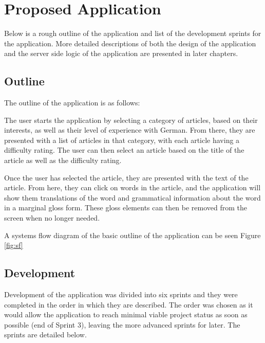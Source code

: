 \chapter{Proposed Application}

Below is a rough outline of the application and list of the development sprints for the application. More detailed descriptions of both the design of the application and the server side logic of the application are presented in later chapters. 

\section{Outline}

The outline of the application is as follows: 

The user starts the application by selecting a category of articles, based on their interests, as well as their level of experience with German. From there, they are presented with a list of articles in that category, with each article having a difficulty rating. The user can then select an article based on the title of the article as well as the difficulty rating.

Once the user has selected the article, they are presented with the text of the article. From here, they can click on words in the article, and the application will show them translations of the word and grammatical information about the word in a marginal gloss form. These gloss elements can then be removed from the screen when no longer needed.

A systems flow diagram of the basic outline of the application can be seen Figure \ref{fig:sf}



\section{Development}

Development of the application was divided into six sprints and they were completed in the order in which they are described. The order was chosen as it would allow the application to reach minimal viable project status as soon as possible (end of Sprint 3), leaving the more advanced sprints for later. The sprints are detailed below.

